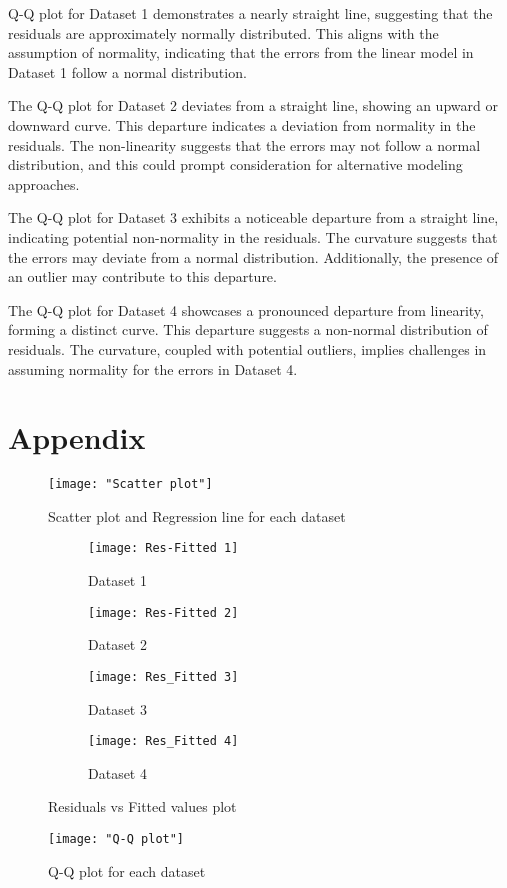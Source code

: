 \documentclass[12pt,doublespace]{article}
\begin{document}
	Q-Q plot for Dataset 1 demonstrates a nearly straight line, suggesting that the residuals are approximately normally distributed. This aligns with the assumption of normality, indicating that the errors from the linear model in Dataset 1 follow a normal distribution.
		
	The Q-Q plot for Dataset 2 deviates from a straight line, showing an upward or downward curve. This departure indicates a deviation from normality in the residuals. The non-linearity suggests that the errors may not follow a normal distribution, and this could prompt consideration for alternative modeling approaches. 
		
	The Q-Q plot for Dataset 3 exhibits a noticeable departure from a straight line, indicating potential non-normality in the residuals. The curvature suggests that the errors may deviate from a normal distribution. Additionally, the presence of an outlier may contribute to this departure.
		
	The Q-Q plot for Dataset 4 showcases a pronounced departure from linearity, forming a distinct curve. This departure suggests a non-normal distribution of residuals. The curvature, coupled with potential outliers, implies challenges in assuming normality for the errors in Dataset 4.	
	\section {Appendix}
		\begin{figure} [H]
			\centering
			\texttt{[image: "Scatter plot"]}
			\caption{Scatter plot and Regression line for each dataset}
			\label{fig:scatter-plot}
		\end{figure}
			\begin{figure}
			\begin{subfigure}{0.5\textwidth}
				\centering
				\texttt{[image: Res-Fitted 1]}
				\caption{Dataset 1}
				\label{fig:Res-Fitted 1}
			\end{subfigure}%
			\begin{subfigure}{0.5\textwidth}
				\centering
				\texttt{[image: Res-Fitted 2]}
				\caption{Dataset 2}
				\label{fig:Res-Fitted 2}
			\end{subfigure}
			\vspace{\baselineskip} 
			\begin{subfigure}{0.5\textwidth}
				\centering
				\texttt{[image: Res\_Fitted 3]}
				\caption{Dataset 3}
				\label{fig:Res-Fitted 3}
			\end{subfigure}%
			\begin{subfigure}{0.5\textwidth}
				\centering
				\texttt{[image: Res\_Fitted 4]}
				\caption{Dataset 4}
				\label{fig:Res-Fitted 4}
			\end{subfigure}
				\caption{Residuals vs Fitted values plot}
			\label{fig: 4 datasets}
		\end{figure}
		\begin{figure}
			\centering
			\texttt{[image: "Q-Q plot"]}
			\caption{Q-Q plot for each dataset}
			\label{fig:q-q-plot}
		\end{figure}
		\clearpage
\end{document}
